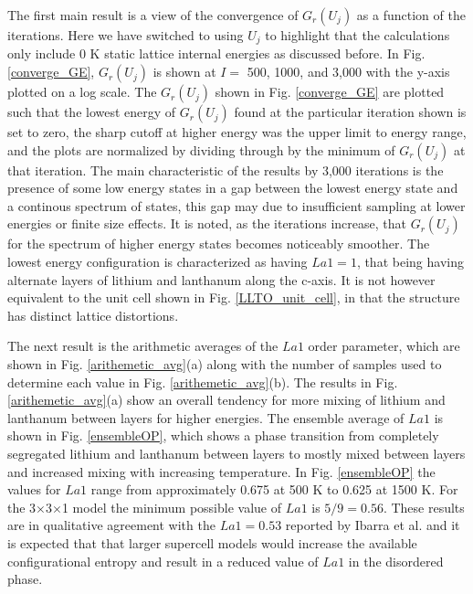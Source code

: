 \documentclass[aps,pre,reprint,superscriptaddress,showkeys]{revtex4-1}
\begin{document}
The first main result is a view of the convergence of $G_r(U_j)$ as a function of the iterations. Here we have switched to using $U_j$ to highlight that the calculations only include 0 K static lattice internal energies as discussed before. In Fig. \ref{converge_GE},  $G_r(U_j)$ is shown at  $I= $ 500, 1000, and 3,000 with the y-axis plotted on a log scale. The  $G_r(U_j)$ shown in Fig. \ref{converge_GE}  are plotted such that the lowest energy of $G_r(U_j)$ found at the particular iteration shown is set to zero, the sharp cutoff at higher energy was the upper limit to energy range, and the plots are normalized by dividing through by the minimum of $G_r(U_j)$ at that iteration.  The main characteristic of the results by 3,000 iterations is the presence of some low energy states in a gap between the lowest energy state and a continous spectrum of states, this gap may due to insufficient sampling at lower energies or finite size effects. It is noted, as the iterations increase, that $G_r(U_j)$ for the spectrum of higher energy states becomes noticeably smoother.  The lowest energy configuration is  characterized as having  $La1=1$, that being having alternate layers of lithium and lanthanum along the c-axis. It is not however equivalent to the unit cell shown in Fig. \ref{LLTO_unit_cell}, in that the structure has distinct lattice distortions. 


The next result is the arithmetic averages of the $La1$  order parameter, which are  shown in Fig. \ref{arithemetic_avg}(a) along with the number of samples used to determine each value in Fig. \ref{arithemetic_avg}(b). The results in Fig. \ref{arithemetic_avg}(a) show an overall tendency for more mixing of lithium and lanthanum between layers for higher energies. The ensemble average of $La1$ is shown in Fig. \ref{ensembleOP}, which shows a phase transition from completely segregated lithium and lanthanum between layers to mostly mixed between layers and increased mixing with increasing temperature. In Fig. \ref{ensembleOP} the values for $La1$ range from approximately 0.675 at 500 K to 0.625 at 1500 K.  For the 3$\times$3$\times$1 model the minimum possible value of $La1$ is $5/9 = 0.56$. These results are in qualitative agreement with the $La1=0.53$ reported by Ibarra et al. \cite{P4mmmstrucuture}  and it is expected that that larger supercell models would increase the available configurational entropy and result in a reduced value of $La1$ in the disordered phase. 
\end{document}
